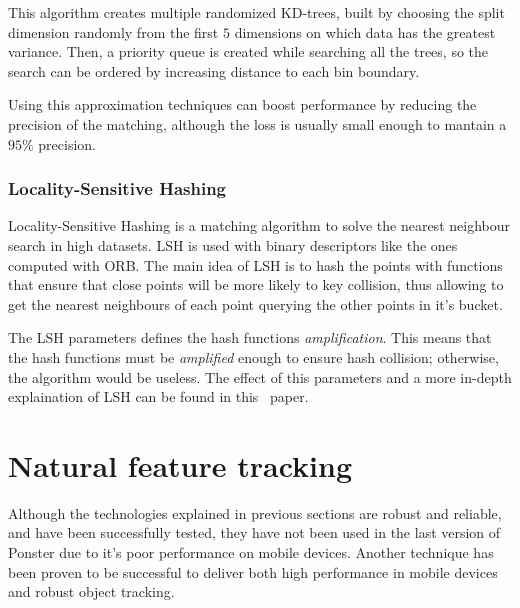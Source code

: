 This algorithm creates multiple randomized KD-trees, built by choosing the
split dimension randomly from the first $5$ dimensions on which data has the
greatest variance. Then, a priority queue is created while searching all the
trees, so the search can be ordered by increasing distance to each bin
boundary. 

Using this approximation techniques can boost performance by reducing the
precision of the matching, although the loss is usually small enough to mantain
a $95\%$ precision. 

\subsubsection{Locality-Sensitive Hashing}
Locality-Sensitive Hashing is a matching algorithm to solve the nearest
neighbour search in high datasets. LSH is used with binary descriptors like the
ones computed with ORB. The main idea of LSH is to hash the points with
functions that ensure that close points will be more likely to key collision,
thus allowing to get the nearest neighbours of each point querying the other
points in it's bucket\cite{Andoni:2008:NHA:1327452.1327494}.

The LSH parameters defines the hash functions \emph{amplification}. This means that
the hash functions must be \emph{amplified} enough to ensure hash collision;
otherwise, the algorithm would be useless. The effect of this parameters and a more
in-depth explaination of LSH can be found in
this~\cite{Andoni:2008:NHA:1327452.1327494} paper. 

\section{Natural feature tracking}
\label{sec:naturalfeature}
Although the technologies explained in previous sections are robust and reliable,
and have been successfully tested, they have not been used in the last version of
Ponster due to it's poor performance on mobile devices. Another technique has been proven
to be successful to deliver both high performance in mobile devices and robust
object tracking.

